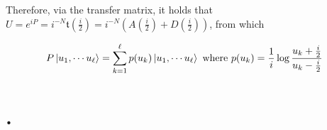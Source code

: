 \documentclass{homework}
\begin{document}
Therefore, via the transfer matrix, it holds that $U = e^{iP} = i^{-N} \mathfrak{t}\left(\frac{i}{2}\right) = i^{-N} \left(A\left(\frac{i}{2}\right) + D\left(\frac{i}{2}\right) \right)$, from which 

\begin{equation}
    P \ket{u_1, \cdots u_\ell} = \sum_{k=1}^{\ell} p(u_k) \ket{u_1, \cdots u_\ell} \textnormal{ where } p(u_k) = \frac{1}{i} \log \frac{u_k + \frac{i}{2}}{u_k - \frac{i}{2}}
\end{equation}

\clearpage 

\section{.}
 
\end{document}
